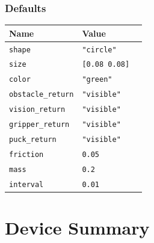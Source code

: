 \documentclass[11pt,twoside]{report}
\begin{document}
\subsubsection*{Defaults}
\begin{tabularx}{\columnwidth}{llX}
\hline
Name & Value\\
\hline
\verb'shape' & \verb'"circle"'\\
\verb'size' & \verb'[0.08 0.08]'\\
\verb'color' & \verb'"green"'\\
\verb'obstacle_return' & \verb'"visible"'\\
\verb'vision_return' & \verb'"visible"'\\
\verb'gripper_return' & \verb'"visible"'\\
\verb'puck_return' & \verb'"visible"'\\
\verb'friction' & \verb'0.05'\\
\verb'mass' & \verb'0.2'\\
\verb'interval' & \verb'0.01'\\
\hline
\end{tabularx}


\newpage
\section{Device Summary}
\label{sec.ref.devices}
\end{document}
